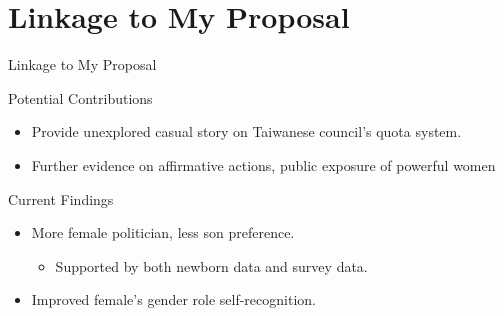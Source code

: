 \documentclass[
  10pt,
  ignorenonframetext,
  aspectratio=43,
]{beamer}
\providecommand{\tightlist}{%
  \setlength{\itemsep}{0pt}\setlength{\parskip}{0pt}}
\begin{document}
\hypertarget{linkage-to-my-proposal}{%
\section{Linkage to My Proposal}\label{linkage-to-my-proposal}}

\begin{frame}{Linkage to My Proposal}
\begin{block}{Potential Contributions}
\protect\hypertarget{potential-contributions}{}
\begin{itemize}
\tightlist
\item
  Provide unexplored casual story on Taiwanese council's quota system.
\item
  Further evidence on affirmative actions, public exposure of powerful
  women
\end{itemize}
\end{block}

\begin{block}{Current Findings}
\protect\hypertarget{current-findings}{}
\begin{itemize}
\tightlist
\item
  More female politician, less son preference.

  \begin{itemize}
  \tightlist
  \item
    Supported by both newborn data and survey data.
  \end{itemize}
\item
  Improved female's gender role self-recognition.
\end{itemize}
\end{block}
\end{frame}
\end{document}

